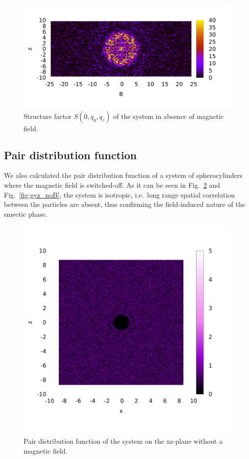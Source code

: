 \documentclass[aip,graphicx]{revtex4-1} %
\begin{document}
\begin{figure}
    \centering
    \includegraphics[width=0.7\columnwidth]{Syz_noB.png}
    \caption{Structure factor $S(0, q_y, q_z)$ of the system in absence of magnetic field.}\label{fig:Syz_noB}
\end{figure}

\subsection{Pair distribution function}

We also calculated the pair distribution function of a system of spherocylinders where the magnetic field is switched-off. 
As it can be seen in Fig.~\ref{fig:gxz_noB} and Fig.~\ref{fig:gyz_noB}, the system is isotropic, i.e.~long range
spatial correlation between the particles are absent, thus confirming the field-induced nature of the smectic phase.

\begin{figure}
    \centering
    \includegraphics[width=0.5\columnwidth]{gxz_noB.png}
    \caption{Pair distribution function of the system on the xz-plane without a magnetic field.}\label{fig:gxz_noB}
\end{figure}
\end{document}
